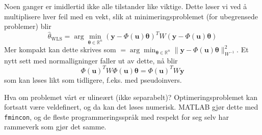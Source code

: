 Noen ganger er imidlertid ikke alle tilstander like viktige. Dette løser vi ved å multiplisere hver feil med en vekt, slik at minimeringsproblemet (for ubegrensede problemer) blir
\begin{equation}
\widehat{\theta}_{\mathrm{WLS}}=\arg \min _{\boldsymbol{\theta} \in \mathbb{R}^{n}}(\boldsymbol{y}-\Phi(\boldsymbol{u}) \boldsymbol{\theta})^{T} W(\boldsymbol{y}-\Phi(\boldsymbol{u}) \boldsymbol{\theta})
\end{equation}
Mer kompakt kan dette skrives som $
=\arg \min _{\boldsymbol{\theta} \in \mathbb{R}^{n}}\|\boldsymbol{y}-\Phi(\boldsymbol{u}) \boldsymbol{\theta}\|_{W^{-1}}^{2}
$. Et nytt sett med normalligninger faller ut av dette, nå blir 
\begin{equation}
\Phi(\boldsymbol{u})^{T} W \Phi(\boldsymbol{u}) \boldsymbol{\theta}=\Phi(\boldsymbol{u})^{T} W \boldsymbol{y}
\end{equation}
som kan løses likt som tidligere, f.eks. med pseudoinvers.

Hva om problemet vårt er ulineært (ikke separabelt)? Optimeringsproblemet kan fortsatt være veldefinert, og da kan det løses numerisk. MATLAB gjør dette med \texttt{fmincon}, og de fleste programmeringsspråk med respekt for seg selv har rammeverk som gjør det samme.
